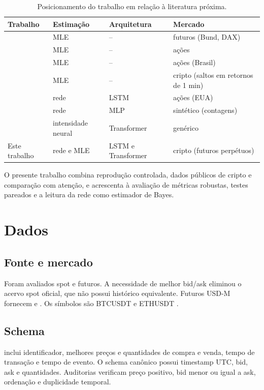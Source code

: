 \documentclass[12pt,a4paper,openany]{report}
\begin{document}
\begin{table}[htbp]
\centering
\caption{Posicionamento do trabalho em relação à literatura próxima.}
\label{tab:posicionamento}
\small
\begin{tabularx}{\linewidth}{lllX}
\toprule
Trabalho & Estimação & Arquitetura & Mercado\\
\midrule
\citet{bacry2013} & MLE & -- & futuros (Bund, DAX)\\
\citet{leeseo2017} & MLE & -- & ações\\
\citet{primo2018} & MLE & -- & ações (Brasil)\\
\citet{taddeo2024} & MLE & -- & cripto (saltos em retornos de 1 min)\\
\citet{lee2023} & rede & LSTM & ações (EUA)\\
\citet{lambe2025} & rede & MLP & sintético (contagens)\\
\citet{zuo2020} & intensidade neural & Transformer & genérico\\
Este trabalho & rede e MLE & LSTM e Transformer & cripto (futuros perpétuos)\\
\bottomrule
\end{tabularx}
\end{table}

O presente trabalho combina reprodução controlada, dados públicos de cripto e
comparação com atenção, e acrescenta à avaliação de \citet{lee2023} métricas robustas,
testes pareados e a leitura da rede como estimador de Bayes.

\chapter{Dados}

\section{Fonte e mercado}

Foram avaliados spot e futuros. A necessidade de melhor bid/ask eliminou o acervo spot
oficial, que não possui  histórico equivalente. Futuros USD-M
fornecem  e . Os símbolos são BTCUSDT e
ETHUSDT \citep{binancePublicData}.

\section{Schema}

 inclui identificador, melhores preços e quantidades de compra e
venda, tempo de transação e tempo de evento. O schema canônico possui timestamp UTC,
bid, ask e quantidades. Auditorias verificam preço positivo, bid menor ou igual a ask,
ordenação e duplicidade temporal.
\end{document}
